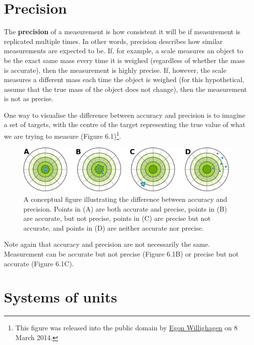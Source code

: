 \documentclass[
]{scrbook}
\begin{document}
\hypertarget{precision}{%
\section{Precision}\label{precision}}

The \textbf{precision} of a measurement is how consistent it will be if measurement is replicated multiple times.
In other words, precision describes how similar measurements are expected to be.
If, for example, a scale measures an object to be the exact same mass every time it is weighed (regardless of whether the mass is accurate), then the measurement is highly precise.
If, however, the scale measures a different mass each time the object is weighed (for this hypothetical, assume that the true mass of the object does not change), then the measurement is not as precise.

One way to visualise the difference between accuracy and precision is to imagine a set of targets, with the centre of the target representing the true value of what we are trying to measure (Figure 6.1)\footnote{This figure was released into the public domain by \href{https://commons.wikimedia.org/wiki/File:Accuracy-vs-precision-nl.svg}{Egon Willighagen} on 8 March 2014.}.

\begin{figure}
\includegraphics[width=1\linewidth]{img/accuracy_vs_precision} \caption{A conceptual figure illustrating the difference between accuracy and precision. Points in (A) are both accurate and precise, points in (B) are accurate, but not precise, points in (C) are precise but not accurate, and points in (D) are neither accurate nor precise.}\label{fig:unnamed-chunk-21}
\end{figure}

Note again that accuracy and precision are not necessarily the same.
Measurement can be accurate but not precise (Figure 6.1B) or precise but not accurate (Figure 6.1C).

\hypertarget{systems-of-units}{%
\section{Systems of units}\label{systems-of-units}}
\end{document}
